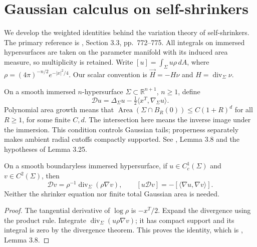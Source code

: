 \chapter{Gaussian calculus on self-shrinkers}\label{sec:shrinker-calculus}
We develop the weighted identities behind the variation theory of self-shrinkers. The primary reference is \cite{CM12}, Section 3.3, pp.~772--775. All integrals on immersed hypersurfaces are taken on the parameter manifold with its induced area measure, so multiplicity is retained. Write $[u]=\int_\Sigma u\rho\,dA$, where $\rho=(4\pi)^{-n/2}e^{-|x|^2/4}$. Our scalar convention is $\vec H=-H\nu$ and $H=\operatorname{div}_\Sigma\nu$.

\begin{definition}\label{def:gaussian-drift}
On a smooth immersed $n$-hypersurface $\Sigma\subset\mathbb R^{n+1}$, $n\geq1$, define
\[
 \mathcal D u=\Delta_\Sigma u-\tfrac12\langle x^T,\nabla_\Sigma u\rangle.
\]
Polynomial area growth means that $\operatorname{Area}(\Sigma\cap B_R(0))\leq C(1+R)^d$ for all $R\geq1$, for some finite $C,d$. The intersection here means the inverse image under the immersion. This condition controls Gaussian tails; properness separately makes ambient radial cutoffs compactly supported. See \cite{CM12}, Lemma 3.8 and the hypotheses of Lemma 3.25.
\end{definition}

\begin{lemma}\label{lem:gaussian-integration-parts}
On a smooth boundaryless immersed hypersurface, if $u\in C_c^1(\Sigma)$ and $v\in C^2(\Sigma)$, then
\[
 \mathcal Dv=\rho^{-1}\operatorname{div}_\Sigma(\rho\nabla v),
 \qquad [u\mathcal Dv]=-[\langle\nabla u,\nabla v\rangle].
\]
Neither the shrinker equation nor finite total Gaussian area is needed.
\end{lemma}
\begin{proof}
The tangential derivative of $\log\rho$ is $-x^T/2$. Expand the divergence using the product rule. Integrate $\operatorname{div}_\Sigma(u\rho\nabla v)$; it has compact support and its integral is zero by the divergence theorem. This proves the identity, which is \cite{CM12}, Lemma 3.8.
\end{proof}


